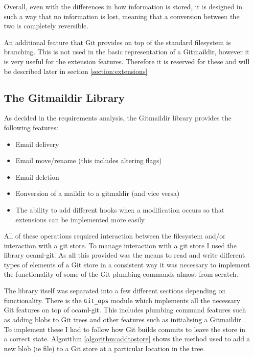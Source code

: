 Overall, even with the differences in how information is stored, it is designed in such a way that no information is lost, meaning that a conversion between the two is completely reversible.

An additional feature that Git provides on top of the standard filesystem is branching. This is not used in the basic representation of a Gitmaildir, however it is very useful for the extension features. Therefore it is reserved for these and will be described later in section \ref{section:extensions}

\subsection{The Gitmaildir Library}

As decided in the requirements analysis, the Gitmaildir library provides the following features:

\begin{itemize}
\item Email delivery
\item Email move/rename (this includes altering flags)
\item Email deletion
\item Eonversion of a maildir to a gitmaldir (and vice versa)
\item The ability to add different hooks when a modification occurs so that extensions can be implemented more easily
\end{itemize}

All of these operations required interaction between the filesystem and/or interaction with a git store. To manage interaction with a git store I used the library ocaml-git. As all this provided was the means to read and write different types of elements of a Git store in a consistent way it was necessary to implement the functionality of some of the Git plumbing commands almost from scratch.

The library itself was separated into a few different sections depending on functionality. There is the \texttt{Git\_ops} module which implements all the necessary Git features on top of ocaml-git. This includes plumbing command features such as adding blobs to Git trees and other features such as initialising a Gitmaildir. To implement these I had to follow how Git builds commits to leave the store in a correct state. Algorithm \ref{algorithm:addtostore} shows the method used to add a new blob (ie file) to a Git store at a particular location in the tree.

